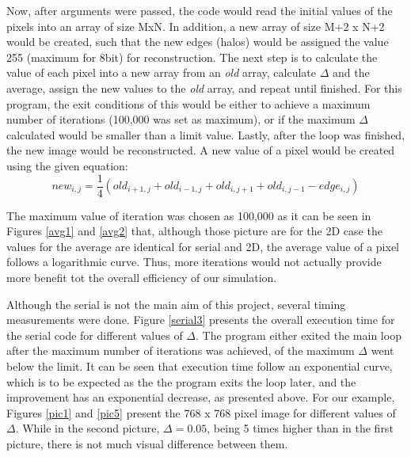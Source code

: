 \documentclass[11pt]{article}
\begin{document}
	Now, after arguments were passed, the code would read the initial values of the pixels into an array of size MxN. In addition, a new array of size M+2 x N+2 would be created, such that the new edges (halos) would be assigned the value 255 (maximum for 8bit) for reconstruction. The next step is to calculate the value of each pixel into a new array from an \textit{old} array, calculate $\Delta$ and the average, assign the new values to the \textit{old} array, and repeat until finished. For this program, the exit conditions of this would be either to achieve a maximum number of iterations (100,000 was set as maximum), or if the maximum $\Delta$ calculated would be smaller than a limit value. Lastly, after the loop was finished, the new image would be reconstructed. A new value of a pixel would be created using the given equation:
	$$new_{i,j} = \frac{1}{4}(old_{i+1,j} + old_{i-1,j} + old_{i,j+1} + old_{i,j-1} - edge_{i,j})$$
	
	The maximum value of iteration was chosen as 100,000 as it can be seen in Figures \ref{avg1} and \ref{avg2} that, although those picture are for the 2D case the values for the average are identical for serial and 2D, the average value of a pixel follows a logarithmic curve. Thus, more iterations would not actually provide more benefit tot the overall efficiency of our simulation.
	
	Although the serial is not the main aim of this project, several timing measurements were done. Figure \ref{serial3} presents the overall execution time for the serial code for different values of $\Delta$. The program either exited the main loop after the maximum number of iterations was achieved, of the maximum $\Delta$ went below the limit. It can be seen that execution time follow an exponential curve, which is to be expected as the the program exits the loop later, and the improvement has an exponential decrease, as presented above. For our example, Figures \ref{pic1} and \ref{pic5} present the 768 x 768 pixel image for different values of $\Delta$. While in the second picture, $\Delta=0.05$, being 5 times higher than in the first picture, there is not much visual difference between them. 
	
\end{document}
